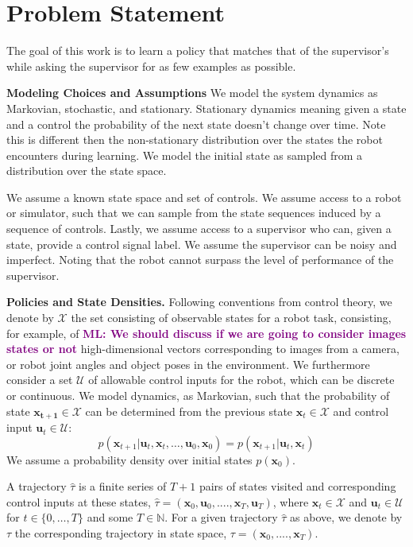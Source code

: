 \documentclass[10pt, conference]{ieeeconf}      %
\newcommand{\bu}{\mathbf{u}}
\newcommand{\bx}{\mathbf{x}}
\newcommand{\mlnote}[1]{\ifthenelse{ \boolean{include-notes}}%
 {\textcolor{purple}{\textbf{ML: #1}}}{}}
\begin{document}
\section{Problem Statement}
The goal of this work is to learn a policy that matches that of the supervisor's while asking the supervisor for as few examples as possible.


\noindent\textbf{Modeling Choices and Assumptions}  We model the system dynamics as Markovian, stochastic, and stationary. Stationary dynamics meaning  given a state and a control the probability of the next state doesn't change over time. Note this is different then the non-stationary distribution over the states the robot encounters during learning. We model the initial state as sampled from a distribution over the state space.

We assume a known state space and set of controls. We assume access to a robot or simulator, such that we  can sample from the state sequences induced by a sequence of controls.   Lastly, we assume access to a supervisor who can, given a state, provide a control signal label. We assume the supervisor can be noisy and imperfect. Noting that the robot cannot surpass the level of performance of the supervisor. 


\noindent\textbf{Policies and State Densities.}
Following conventions from control theory, we denote by $\mathcal{X}$ the set consisting of observable states for a robot task, consisting, for example, of \mlnote{We should discuss if we are going to consider images states or not}
high-dimensional vectors corresponding to images from a camera, or robot joint angles and object poses in the environment.
We furthermore consider a set $\mathcal{U}$ of allowable control inputs for the robot, which can be discrete or
continuous. We model dynamics, as Markovian, such that the probability of state $\mathbf{x_{t+1}}\in
\mathcal{X}$ can be determined from the previous state $\mathbf{x}_t\in\mathcal{X}$ and control input $\mathbf{u}_t\in
\mathcal{U}$: 
$$p(\bx_{t+1}|\bu_{t},\bx_{t}, \ldots, \bu_{0}, \bx_{0})=p(\bx_{t+1}|\bu_{t}, \bx_t)$$
We assume a probability density over initial states $p(\bx_0)$.

A trajectory $\hat{\tau}$ is a finite series of $T+1$ pairs of states visited and corresponding
control inputs at these states, $\hat{\tau} = (\mathbf{x}_0,\mathbf{u}_0, ...., \mathbf{x}_T,\mathbf{u}_T)$, where $\bx_t\in \mathcal{X}$
and $\bu_t\in \mathcal{U}$ for $t\in \{0, \ldots, T\}$ and some $T\in \mathbb{N}$.  
For a given trajectory $\hat{\tau}$ as above, we denote by ${\tau}$ the corresponding trajectory in state space,
${\tau} = (\bx_0,....,\bx_T)$.
\end{document}

